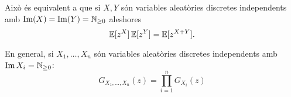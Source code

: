 \begin{obs}
    Això \'es equivalent a que si $X, Y$ són variables aleatòries discretes independents
    amb $\operatorname{Im}(X) = \operatorname{Im}(Y) = \mathbb{N}_{\geq 0}$ aleshores
    \[
        \operatorname{\mathbb{E}}[z^X]\operatorname{\mathbb{E}}[z^Y] = \operatorname{\mathbb{E}}[z^{X+Y}].
    \]
\end{obs}

\begin{obs}
    En general, si $X_1, \dots, X_n$ són variables aleatòries discretes independents amb
    $\operatorname{Im} X_i = \mathbb{N}_{\geq 0}$:
    \[
        G_{X_1,\dots,X_n}(z) = \prod_{i = 1}^n G_{X_i}(z)
    \]
\end{obs}
